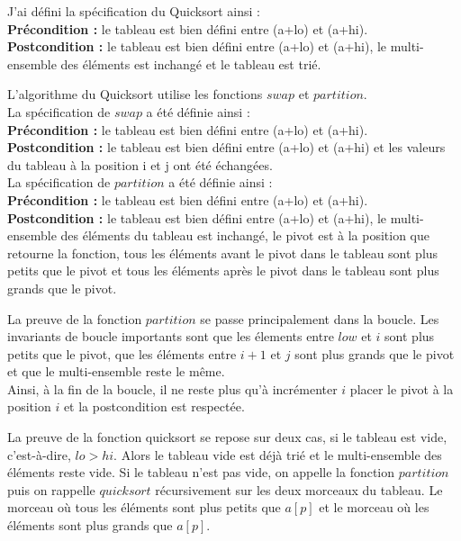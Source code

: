 \documentclass[11pt,openany]{article}
\begin{document}
		J'ai d\'efini la sp\'ecification du Quicksort ainsi :\\
		\textbf{Pr\'econdition :} le tableau est bien d\'efini entre (a+lo) et (a+hi).\\
		\textbf{Postcondition :} le tableau est bien d\'efini entre (a+lo) et (a+hi), le multi-ensemble des \'el\'ements est inchang\'e et le tableau est tri\'e.\par 
		L'algorithme du Quicksort utilise les fonctions $swap$ et $partition$.\\ La sp\'ecification de $swap$ a \'et\'e d\'efinie ainsi :\\
		\textbf{Pr\'econdition :} le tableau est bien d\'efini entre (a+lo) et (a+hi).\\
		\textbf{Postcondition :} le tableau est bien d\'efini entre (a+lo) et (a+hi) et les valeurs du tableau \`a la position i et j ont \'et\'e \'echang\'ees. \\
La sp\'ecification de $partition$ a \'et\'e d\'efinie ainsi :\\
		\textbf{Pr\'econdition :} le tableau est bien d\'efini entre (a+lo) et (a+hi).\\
		\textbf{Postcondition :} le tableau est bien d\'efini entre (a+lo) et (a+hi), le multi-ensemble des \'el\'ements du tableau est inchang\'e, le pivot est \`a la position que retourne la fonction, tous les \'el\'ements avant le pivot dans le tableau sont plus petits que le pivot et tous les \'el\'ements apr\`es le pivot dans le tableau sont plus grands que le pivot.\par 
		La preuve de la fonction $partition$ se passe principalement dans la boucle. Les invariants de boucle importants sont que les \'elements entre $low$ et $i$ sont plus petits que le pivot, que les \'el\'ements entre $i+1$ et $j$ sont plus grands que le pivot et que le multi-ensemble reste le m\^eme.\\
		Ainsi, \`a la fin de la boucle, il ne reste plus qu'\`a incr\'ementer $i$ placer le pivot \`a la position $i$ et la postcondition est respect\'ee. \par
		La preuve de la fonction quicksort se repose sur deux cas, si le tableau est vide, c'est-\`a-dire, $lo > hi$. Alors le tableau vide est d\'ej\`a tri\'e et le multi-ensemble des \'el\'ements reste vide. Si le tableau n'est pas vide, on appelle la fonction $partition$ puis on rappelle $quicksort$ r\'ecursivement sur les deux morceaux du tableau. Le morceau o\`u tous les \'el\'ements sont plus petits que $a[p]$ et le morceau o\`u les \'el\'ements sont plus grands que $a[p]$.\par
\end{document}
